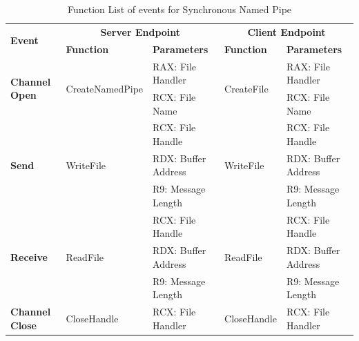     \begin{table}[H]
        \centering
        \caption{Function List  of events for Synchronous Named Pipe}
        \label{synfunctions}
        \begin{tabular}{|l|l|l|l|l|}
            \hline
             \multirow{2}{*}{\textbf{Event}} &
               \multicolumn{2}{c|}{\textbf{Server Endpoint}} &
               \multicolumn{2}{c|}{\textbf{Client Endpoint}} \\
             \cline{2-5}
              & \textbf{Function}& \textbf{Parameters} & \textbf{Function} & \textbf{Parameters}  \\
             \hline
             \multirow{2}{*}{{\textbf{Channel Open}}}
             &\multirow{2}{*}{{CreateNamedPipe}} &  RAX: File Handler & \multirow{2}{*}{CreateFile} &  RAX: File Handler\\
              \cline{3-3} \cline{5-5}
             &&  RCX: File Name &  &  RCX: File Name\\
            \hline
             \multirow{3}{*}{{\textbf{Send}}}
             &\multirow{3}{*}{WriteFile} &  RCX: File Handle & \multirow{3}{*}{WriteFile} &  RCX: File Handle\\
              \cline{3-3} \cline{5-5}
             &&  RDX: Buffer Address &  &  RDX: Buffer Address\\
                           \cline{3-3} \cline{5-5}
             & &  R9: Message Length &  &  R9: Message Length\\
            \hline
             \multirow{3}{*}{{\textbf{Receive}}}
             & \multirow{3}{*}{ReadFile}&  RCX: File Handle & \multirow{3}{*}{ReadFile} &  RCX: File Handle\\
              \cline{3-3} \cline{5-5}
              &&  RDX: Buffer Address &  &  RDX: Buffer Address\\
                           \cline{3-3} \cline{5-5}
             & &  R9: Message Length &  &  R9: Message Length\\
            \hline
           {{\textbf{Channel Close}}}
             &{CloseHandle} & {RCX: File Handler} & {CloseHandle} & {RCX: File Handler}\\
            \hline
        \end{tabular}
    \end{table}

